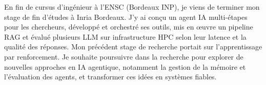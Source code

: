 
\begin{cvparagraph}
En fin de cursus d’ingénieur à l’ENSC (Bordeaux INP), je viens de terminer mon stage de fin d’études à Inria Bordeaux. J’y ai conçu un agent IA multi-étapes pour les chercheurs, développé et orchestré ses outils, mis en œuvre un pipeline RAG et évalué plusieurs LLM sur infrastructure HPC selon leur latence et la qualité des réponses. Mon précédent stage de recherche portait sur l’apprentissage par renforcement. Je souhaite poursuivre dans la recherche pour explorer de nouvelles approches en IA agentique, notamment la gestion de la mémoire et l’évaluation des agents, et transformer ces idées en systèmes fiables.
\end{cvparagraph}
